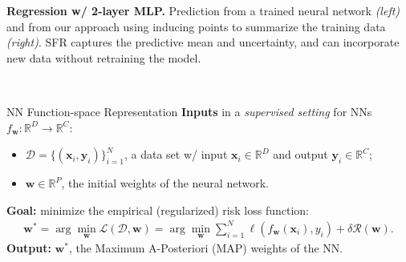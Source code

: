 \documentclass[final,12pt]{beamer}
\newcommand{\mbf}[1]{\mathbf{#1}}
\newcommand{\dataset}{\ensuremath{\mathcal{D}}}
\newcommand{\inputDomain}{\ensuremath{\mathbb{R}^{D}}}
\newcommand{\outputDomain}{\ensuremath{\mathbb{R}^{C}}}
\newcommand{\weights}{\ensuremath{\mathbf{w}}}
\newcommand{\vx}{\mbf{x}}
\newcommand{\vy}{\mbf{y}}
\newcommand{\R}{\mathbb{R}}
\newlength{\colwidth}
\begin{document}
\begin{frame}[t]
\begin{columns}[t]
\begin{column}{\colwidth}
\begin{minipage}{\textwidth}
    \alert{\bf Regression w/ 2-layer MLP.} 
    Prediction from a trained neural network {\it (left)} and from our approach using inducing points to summarize the training data {\it (right)}. SFR captures the predictive mean and uncertainty, and can incorporate new data without retraining the model.
   \end{minipage}\\[0.5cm]

  \begin{block}{NN Function-space Representation}
  \alert{\bf Inputs} in a {\it supervised setting} for NNs $f_\mathbf{w}: \inputDomain \to \outputDomain$:\
  \begin{itemize}
  \item $\dataset = \{(\vx_{i} , \vy_{i})\}_{i=1}^{N}$, a data set w/ input $\vx_i \in \inputDomain$ and output $\vy_i \in \outputDomain$;
  \item $\weights \in \R^{P}$, the initial weights of the neural network.
  \end{itemize}
\alert{\bf Goal: }
  minimize the empirical (regularized) risk loss function:
\begin{align} 
  \weights^{*} =  \arg \min_{\weights} \mathcal{L}(\dataset,\weights) \nonumber
     = \arg \min_{\weights} \textstyle\sum_{i=1}^{N} \ell(f_\weights(\mathbf{x}_{i}), y_i) + \delta \mathcal{R}(\weights).
 \end{align}
\alert{\bf Output:} $\weights^*$, the Maximum A-Posteriori (MAP) weights of the NN.\\[0.5cm]


\end{block}
\end{column}
\end{columns}
\end{frame}
\end{document}
